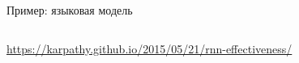 \documentclass[notes,12pt, aspectratio=169]{beamer}
\begin{document}
\begin{frame}{Пример: языковая модель}
\begin{columns}
\begin{column}{.7\linewidth}
\begin{center}
		\end{center}
		\end{column}	
		\end{columns}
\vfill 
\footnotesize 
\color{blue} \url{https://karpathy.github.io/2015/05/21/rnn-effectiveness/} 
\end{frame}
\end{document}
